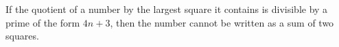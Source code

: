 If the quotient of a number by the largest square it contains is divisible by a prime of the form $4n + 3$, then the number cannot be written as a sum of two squares.
